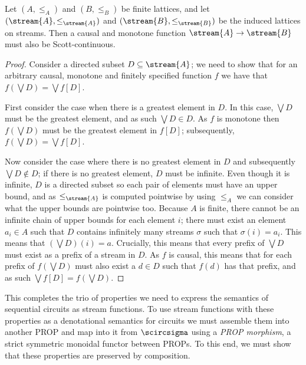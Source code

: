 \begin{lemma}
    Let \((A, \leq_A)\) and \((B, \leq_B)\) be finite lattices, and let
    \((\stream{A}, \leq_{\stream{A}})\) and \((\stream{B}, \leq_{\stream{B}})\)
    be the induced lattices on streams.
    Then a causal and monotone function \(\stream{A} \to \stream{B}\) must also
    be Scott-continuous.
\end{lemma}
\begin{proof}
    Consider a directed subset \(D \subseteq \stream{A}\); we need to show that
    for an arbitrary causal, monotone and finitely specified function \(f\) we
    have that \(f\left(\bigvee D\right) = \bigvee f[D]\).

    First consider the case when there is a greatest element in \(D\).
    In this case, \(\bigvee D\) must be the greatest element, and as such
    \(\bigvee D \in D\).
    As \(f\) is monotone then \(f(\bigvee D)\) must be the greatest element in
    \(f[D]\); subsequently, \(f\left(\bigvee D\right) = \bigvee f[D]\).

    Now consider the case where there is no greatest element in \(D\) and
    subsequently \(\bigvee D \not\in D\); if there is no greatest element,
    \(D\) must be infinite.
    Even though it is infinite, \(D\) is a directed subset so each pair of
    elements must have an upper bound, and as \(\leq_{\stream{A}}\) is computed
    pointwise by using \(\leq_A\) we can consider what the upper bounds are
    pointwise too.
    Because \(A\) is finite, there cannot be an infinite chain of upper bounds
    for each element \(i\); there must exist an element \(a_i \in A\) such that
    \(D\) contains infinitely many streams \(\sigma\) such that
    \(\sigma(i) = a_i\).
    This means that \(\left(\bigvee D\right)(i) = a\).
    Crucially, this means that every prefix of \(\bigvee D\) must exist as a
    prefix of a stream in \(D\).
    As \(f\) is causal, this means that for each prefix of
    \(f\left(\bigvee D\right)\) must also exist a \(d \in D\) such that
    \(f(d)\) has that prefix, and as such
    \(\bigvee f[D] = f\left(\bigvee D\right)\).
\end{proof}

This completes the trio of properties we need to express the semantics of
sequential circuits as stream functions.
To use stream functions with these properties as a denotational semantics for
circuits we must assemble them into another PROP and map into it from
\(\scircsigma\) using a \emph{PROP morphism}, a strict symmetric monoidal
functor between PROPs.
To this end, we must show that these properties are preserved by composition.

